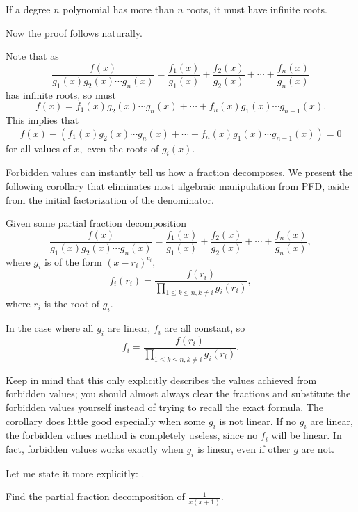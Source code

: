 \documentclass{article}
\begin{document}
\begin{theo}
If a degree $n$ polynomial has more than $n$ roots, it must have infinite roots.
\end{theo}

Now the proof follows naturally.

\begin{pro}
Note that as
\[\frac{f(x)}{g_1(x)g_2(x)\cdots g_n(x)}=\frac{f_1(x)}{g_1(x)}+\frac{f_2(x)}{g_2(x)}+\cdots+\frac{f_n(x)}{g_n(x)}\]
has infinite roots, so must 
\[f(x)=f_1(x)g_2(x)\cdots g_n(x)+\cdots+f_n(x)g_1(x)\cdots g_{n-1}(x).\]
This implies that
\[f(x)-(f_1(x)g_2(x)\cdots g_n(x)+\cdots+f_n(x)g_1(x)\cdots g_{n-1}(x))=0\]
for all values of $x,$ even the roots of $g_i(x).$
\end{pro}

Forbidden values can instantly tell us how a fraction decomposes. We present the following corollary that eliminates most algebraic manipulation from PFD, aside from the initial factorization of the denominator.

\begin{corollary}
Given some partial fraction decomposition
\[\frac{f(x)}{g_1(x)g_2(x)\cdots g_n(x)}=\frac{f_1(x)}{g_1(x)}+\frac{f_2(x)}{g_2(x)}+\cdots+\frac{f_n(x)}{g_n(x)},\] where $g_i$ is of the form $(x-r_i)^{c_i},$
\[f_i(r_i)=\frac{f(r_i)}{\prod\limits_{1\leq k\leq n, k\neq i}g_i(r_i)},\] where $r_i$ is the root of $g_i.$

In the case where all $g_i$ are linear, $f_i$ are all constant, so \[f_i=\frac{f(r_i)}{\prod\limits_{1\leq k\leq n,k\neq i}g_i(r_i)}.\]
\end{corollary}

Keep in mind that this only explicitly describes the values achieved from forbidden values; you should almost always clear the fractions and substitute the forbidden values yourself instead of trying to recall the exact formula. The corollary does little good especially when some $g_i$ is not linear. If no $g_i$ are linear, the forbidden values method is completely useless, since no $f_i$ will be linear. In fact, forbidden values works exactly when $g_i$ is linear, even if other $g$ are not.

Let me state it more explicitly: .

\begin{exam}
Find the partial fraction decomposition of $\frac{1}{x(x+1)}.$
\end{exam}
\end{document}
